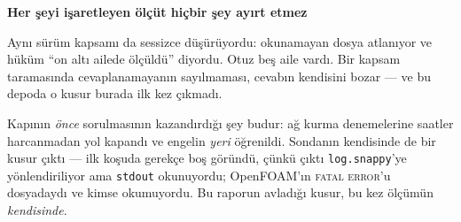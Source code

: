 \documentclass[11pt,a4paper]{article}
\newcommand{\kkkenar}{lacivert}
\newcommand{\kkzemin}{kod}
\newenvironment{renkkutu}[3]{%
  \renewcommand{\kkkenar}{#1}\renewcommand{\kkzemin}{#2}%
  \par\medskip\noindent
  \begin{lrbox}{\kutugovde}%
  \begin{minipage}{\dimexpr\linewidth-2\fboxsep-2\fboxrule\relax}\footnotesize
  \textcolor{#1}{\textbf{#3}}\par\vspace{3pt}%
}{%
  \end{minipage}%
  \end{lrbox}%
  \noindent\fcolorbox{\kkkenar}{\kkzemin}{\usebox{\kutugovde}}%
  \par\medskip
}
\newenvironment{dikkat}[1]{\begin{renkkutu}{orta}{ortabg}{#1}}{\end{renkkutu}}
\begin{document}
\begin{description}
\begin{dikkat}{Her şeyi işaretleyen ölçüt hiçbir şey ayırt etmez}
        Aynı sürüm kapsamı da sessizce düşürüyordu: okunamayan dosya
        atlanıyor ve hüküm ``on altı ailede ölçüldü'' diyordu. Otuz beş aile
        vardı. Bir kapsam taramasında cevaplanamayanın sayılmaması, cevabın
        kendisini bozar --- ve bu depoda o kusur burada ilk kez çıkmadı.
        \end{dikkat}

        \noindent Kapının \emph{önce} sorulmasının kazandırdığı şey budur: ağ
        kurma denemelerine saatler harcanmadan yol kapandı ve engelin \emph{yeri}
        öğrenildi. Sondanın kendisinde de bir kusur çıktı --- ilk koşuda gerekçe
        boş göründü, çünkü çıktı \texttt{log.snappy}'ye yönlendiriliyor ama
        \texttt{stdout} okunuyordu; OpenFOAM'ın \textsc{fatal error}'u dosyadaydı
        ve kimse okumuyordu. Bu raporun avladığı kusur, bu kez ölçümün
        \emph{kendisinde}.


\end{description}
\end{document}
